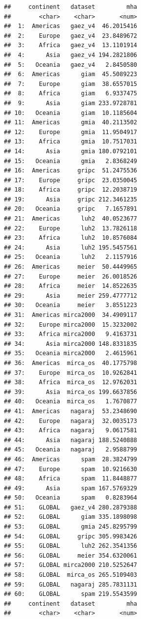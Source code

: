 \documentclass[
  11pt,
]{article}
\begin{document}
\begin{verbatim}
##     continent   dataset         mha
##        <char>    <char>       <num>
##  1:  Americas   gaez_v4  46.2015416
##  2:    Europe   gaez_v4  23.8489672
##  3:    Africa   gaez_v4  13.1101914
##  4:      Asia   gaez_v4 194.2821806
##  5:   Oceania   gaez_v4   2.8450580
##  6:  Americas      giam  45.5089223
##  7:    Europe      giam  38.6557015
##  8:    Africa      giam   6.9337475
##  9:      Asia      giam 233.9728781
## 10:   Oceania      giam  10.1185604
## 11:  Americas      gmia  40.2113502
## 12:    Europe      gmia  11.9504917
## 13:    Africa      gmia  10.7517031
## 14:      Asia      gmia 180.0792101
## 15:   Oceania      gmia   2.8368249
## 16:  Americas     gripc  51.2475536
## 17:    Europe     gripc  23.0350045
## 18:    Africa     gripc  12.2038719
## 19:      Asia     gripc 212.3461235
## 20:   Oceania     gripc   7.1657891
## 21:  Americas      luh2  40.0523677
## 22:    Europe      luh2  13.7826118
## 23:    Africa      luh2  10.8576084
## 24:      Asia      luh2 195.5457561
## 25:   Oceania      luh2   2.1157916
## 26:  Americas     meier  50.4449965
## 27:    Europe     meier  26.0018526
## 28:    Africa     meier  14.8522635
## 29:      Asia     meier 259.4777712
## 30:   Oceania     meier   3.8551223
## 31:  Americas mirca2000  34.4909117
## 32:    Europe mirca2000  15.3232002
## 33:    Africa mirca2000   9.4163731
## 34:      Asia mirca2000 148.8331835
## 35:   Oceania mirca2000   2.4615961
## 36:  Americas  mirca_os  40.1775798
## 37:    Europe  mirca_os  10.9262841
## 38:    Africa  mirca_os  12.9762031
## 39:      Asia  mirca_os 199.6637856
## 40:   Oceania  mirca_os   1.7670877
## 41:  Americas   nagaraj  53.2348690
## 42:    Europe   nagaraj  32.0035173
## 43:    Africa   nagaraj   9.0617581
## 44:      Asia   nagaraj 188.5240888
## 45:   Oceania   nagaraj   2.9588799
## 46:  Americas      spam  28.3824799
## 47:    Europe      spam  10.9216630
## 48:    Africa      spam  11.8448877
## 49:      Asia      spam 167.5769329
## 50:   Oceania      spam   0.8283964
## 51:    GLOBAL   gaez_v4 280.2879388
## 52:    GLOBAL      giam 335.1898098
## 53:    GLOBAL      gmia 245.8295799
## 54:    GLOBAL     gripc 305.9983426
## 55:    GLOBAL      luh2 262.3541356
## 56:    GLOBAL     meier 354.6320061
## 57:    GLOBAL mirca2000 210.5252647
## 58:    GLOBAL  mirca_os 265.5109403
## 59:    GLOBAL   nagaraj 285.7831131
## 60:    GLOBAL      spam 219.5543599
##     continent   dataset         mha
##        <char>    <char>       <num>
\end{verbatim}
\end{document}
